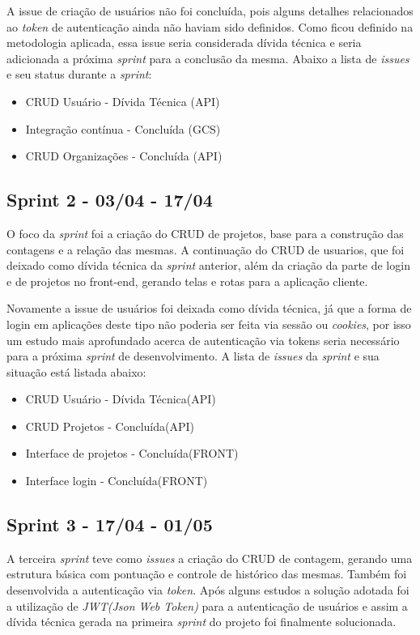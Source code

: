 A issue de criação de usuários não foi concluída, pois alguns detalhes relacionados ao \textit{token} de autenticação ainda não haviam sido definidos. Como ficou definido na metodologia aplicada, essa issue seria considerada dívida técnica e seria adicionada a próxima \textit{sprint} para a conclusão da mesma. Abaixo a lista de \textit{issues} e seu status durante a \textit{sprint}:

\begin{itemize}
  \item CRUD Usuário - Dívida Técnica (API)
  \item Integração contínua - Concluída (GCS)
  \item CRUD Organizações - Concluída (API)
\end{itemize}

\subsection{Sprint 2 - 03/04 - 17/04}

O foco da \textit{sprint} foi a criação do CRUD de projetos, base para a construção das contagens e a relação das mesmas. A continuação do CRUD de usuarios, que foi deixado como dívida técnica da \textit{sprint} anterior, além da criação da parte de login e de projetos no front-end, gerando telas e rotas para a aplicação cliente.

Novamente a issue de usuários foi deixada como dívida técnica, já que a forma de login em aplicações deste tipo não poderia ser feita via sessão ou \textit{cookies}, por isso um estudo mais aprofundado acerca de autenticação via tokens seria necessário para a próxima \textit{sprint} de desenvolvimento. A lista de \textit{issues} da \textit{sprint} e sua situação está listada abaixo:

\begin{itemize}
  \item CRUD Usuário - Dívida Técnica(API)
  \item CRUD Projetos - Concluída(API)
  \item Interface de projetos - Concluída(FRONT)
  \item Interface login - Concluída(FRONT)
\end{itemize}

\subsection{Sprint 3 - 17/04 - 01/05}

A terceira \textit{sprint} teve como \textit{issues} a criação do CRUD de contagem, gerando uma estrutura básica com pontuação e controle de histórico das mesmas. Também foi desenvolvida a autenticação via \textit{token}. Após alguns estudos a solução adotada foi a utilização de \textit{JWT(Json Web Token)} para a autenticação de usuários e assim a dívida técnica gerada na primeira \textit{sprint} do projeto foi finalmente solucionada.

